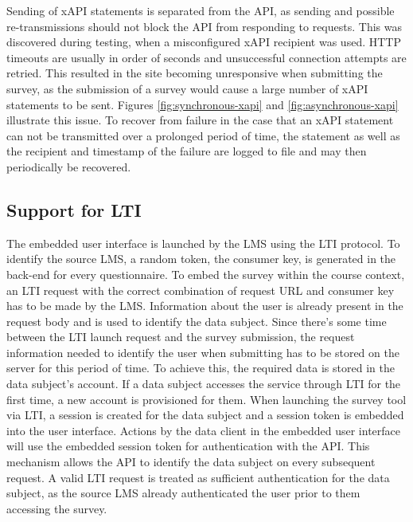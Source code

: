 \documentclass[a4paper,11pt]{article}
\begin{document}
                Sending of xAPI statements is separated from the API, as sending and
                possible re-transmissions should not block the API from responding
                to requests. This was discovered during testing, when a misconfigured xAPI
                recipient was used. HTTP timeouts are usually in order of seconds and 
                unsuccessful connection attempts are retried. This resulted in
                the site becoming unresponsive when submitting the survey, as the submission
                of a survey would cause a large number of xAPI statements to be sent.
                Figures \ref{fig:synchronous-xapi} and \ref{fig:asynchronous-xapi} illustrate
                this issue. To recover from failure in the case that an xAPI statement
                can not be transmitted over a prolonged period of time, the
                statement as well as the recipient and timestamp of the failure
                are logged to file and may then periodically be recovered.

            \subsection{Support for LTI}
                The embedded user interface is launched by the LMS using the LTI protocol.
                To identify the source LMS, a random token, the consumer key,
                is generated in the back-end for every questionnaire. To
                embed the survey within the course context, an LTI request
                with the correct combination of request URL and consumer
                key has to be made by the LMS.
                Information about the user is already present in the
                request body and is used to identify the data subject. 
                Since there's some time between the LTI launch request
                and the survey submission, the request information needed to identify
                the user when submitting
                has to be stored on the server for this period of time.
                To achieve this, the required data is stored in the data subject's account.
                If a data subject accesses the service through LTI for the first time, 
                a new account is provisioned for them.
                When launching the survey tool via LTI, a session is created
                for the data subject and a session token is embedded into
                the user interface. Actions by the data client in the
                embedded user interface will use the embedded session token
                for authentication with the API. This mechanism allows
                the API to identify the data subject on every subsequent
                request. A valid LTI request is treated as sufficient
                authentication for the data subject, as the source LMS already
                authenticated the user prior to them accessing the survey.
\end{document}
